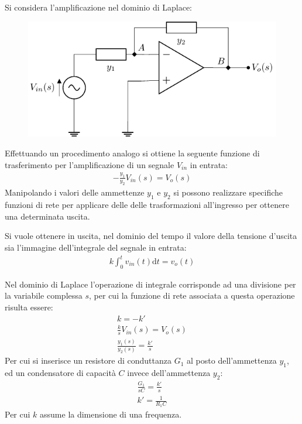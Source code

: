 \documentclass{article}
\newcommand{\df}{\mathrm{d}}
\numberwithin{equation}{subsection}
\begin{document}
Si considera l'amplificazione nel dominio di Laplace:
\begin{figure}[H]%
    \centering
    \includegraphics{amplificazione-invertente-laplace.pdf}%
    \label{fig:amplificazione-invertente-laplace}
\end{figure}

Effettuando un procedimento analogo si ottiene la seguente funzione di trasferimento per l'amplificazione di un segnale $V_{in}$ in entrata:
\begin{gather*}
    \displaystyle-\frac{y_1}{y_2}V_{in}(s)=V_o(s)
\end{gather*}
Manipolando i valori delle ammettenze $y_1$ e $y_2$ si possono realizzare specifiche funzioni di rete per applicare delle delle trasformazioni 
all'ingresso per ottenere una determinata uscita. 

Si vuole ottenere in uscita, nel dominio del tempo il valore della tensione d'uscita sia l'immagine dell'integrale del segnale in entrata:
\begin{gather*}
    \displaystyle k\int_{0}^tv_{in}(t)\df t=v_o(t)
\end{gather*} 

Nel dominio di Laplace l'operazione di integrale corrisponde ad una divisione per la variabile complessa $s$, per cui la funzione di rete 
associata a questa operazione risulta essere:
\begin{gather*}
    k=-k'\\
    \displaystyle\frac{k}{s}V_{in}(s)=V_o(s)\\
    \displaystyle\frac{y_1(s)}{y_2(s)}=\frac{k'}{s}
\end{gather*}
Per cui si inserisce un resistore di conduttanza $G_1$ al posto dell'ammettenza $y_1$, ed un condensatore di capacità $C$ invece dell'ammettenza $y_2$:
\begin{gather*}
    \displaystyle\frac{G_1}{sC}=\frac{k'}{s}\\
    k'=\displaystyle\frac{1}{R_1C}
\end{gather*} 
Per cui $k$ assume la dimensione di una frequenza. 
\end{document}
